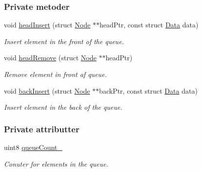 \subsubsection*{Private metoder}
\begin{DoxyCompactItemize}
\item 
void \hyperlink{class_queue_acfcf4994d1169caad1265663e4a12ada}{head\+Insert} (struct \hyperlink{queue_8c_db/d8b/struct_node}{Node} $\ast$$\ast$head\+Ptr, const struct \hyperlink{queue_8h_da/d48/struct_data}{Data} data)
\begin{DoxyCompactList}\small\item\em Insert element in the front of the queue. \end{DoxyCompactList}\item 
void \hyperlink{class_queue_ae54666c891fd21d5497f48c385a00b74}{head\+Remove} (struct \hyperlink{queue_8c_db/d8b/struct_node}{Node} $\ast$$\ast$head\+Ptr)
\begin{DoxyCompactList}\small\item\em Remove element in front af queue. \end{DoxyCompactList}\item 
void \hyperlink{class_queue_a8d1efbbc4aca857d5bcbf0ab2625e1dc}{back\+Insert} (struct \hyperlink{queue_8c_db/d8b/struct_node}{Node} $\ast$$\ast$back\+Ptr, const struct \hyperlink{queue_8h_da/d48/struct_data}{Data} data)
\begin{DoxyCompactList}\small\item\em Insert element in the back of the queue. \end{DoxyCompactList}\end{DoxyCompactItemize}
\subsubsection*{Private attributter}
\begin{DoxyCompactItemize}
\item 
uint8 \hyperlink{class_queue_ad260f9ccca00e80d161bbf3e70c3ffa6}{queue\+Count\+\_\+}
\begin{DoxyCompactList}\small\item\em Conuter for elements in the queue. \end{DoxyCompactList}\end{DoxyCompactItemize}
